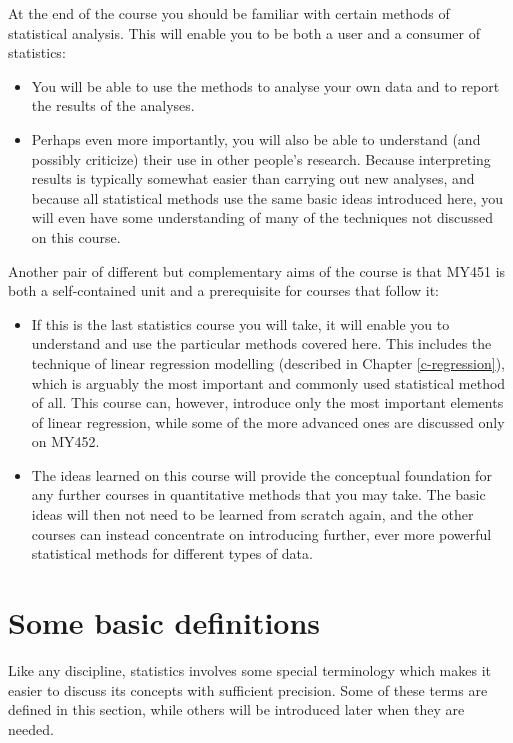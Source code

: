 \documentclass[11pt,a4paper,openany]{book}
\begin{document}
At the end of the course you should be familiar with certain methods of
statistical analysis. This will enable you to be both a user and a
consumer of statistics:

\begin{itemize}
\item
  You will be able to use the methods to analyse your own data and to
  report the results of the analyses.
\item
  Perhaps even more importantly, you will also be able to understand
  (and possibly criticize) their use in other people's research. Because
  interpreting results is typically somewhat easier than carrying out
  new analyses, and because all statistical methods use the same basic
  ideas introduced here, you will even have some understanding of many
  of the techniques not discussed on this course.
\end{itemize}

Another pair of different but complementary aims of the course is that
MY451 is both a self-contained unit and a prerequisite for courses that
follow it:

\begin{itemize}
\item
  If this is the last statistics course you will take, it will enable
  you to understand and use the particular methods covered here. This
  includes the technique of linear regression modelling (described in
  Chapter \ref{c-regression}), which is arguably the most important and
  commonly used statistical method of all. This course can, however,
  introduce only the most important elements of linear regression, while
  some of the more advanced ones are discussed only on MY452.
\item
  The ideas learned on this course will provide the conceptual
  foundation for any further courses in quantitative methods that you
  may take. The basic ideas will then not need to be learned from
  scratch again, and the other courses can instead concentrate on
  introducing further, ever more powerful statistical methods for
  different types of data.
\end{itemize}

\section{Some basic definitions}\label{s-intro-definitions}

Like any discipline, statistics involves some special terminology which
makes it easier to discuss its concepts with sufficient precision. Some
of these terms are defined in this section, while others will be
introduced later when they are needed.
\end{document}
